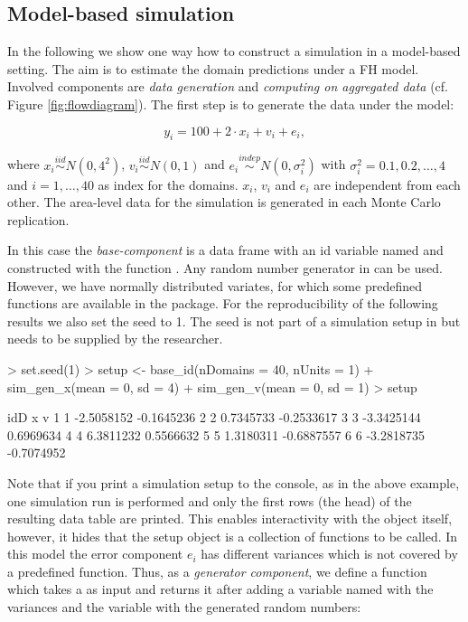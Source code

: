 \documentclass[article]{ajs}
\newcommand{\red}[1]{\color{red} #1 \color{black} }
\begin{document}
\subsection{Model-based simulation}
\label{sec:csModel}

In the following we show one way how to construct a simulation in a model-based setting. The aim is to estimate the domain predictions under a FH model. Involved components are \textit{data generation} and \textit{computing on aggregated data} (cf. Figure \ref{fig:flowdiagram}). The first step is to generate the data under the model:

\[ y_i = 100 + 2 \cdot x_i + v_i + e_i,\]

where $x_i \stackrel{iid}{\sim} N(0, 4^2)$, $v_i \stackrel{iid}{\sim} N(0, 1)$ and $e_i \stackrel{indep}{\sim} N(0, \sigma_i^2)$ with $\sigma_i^2 = 0.1, 0.2, \dots, 4$ and $i = 1, \dots, 40$ as index for the domains. $x_i$, $v_i$ and $e_i$ are independent from each other. The area-level data for the simulation is generated in each Monte Carlo replication. 

In this case the \textit{base-component} is a data frame with an id variable named  and constructed with the function . Any random number generator in  can be used. However, we have normally distributed variates, for which some predefined functions are available in the package. \red{For the reproducibility of the following results we also set the seed to 1. The seed is not part of a simulation setup in \proglang{saeSim} but needs to be supplied by the researcher.}

\begin{Schunk}
\begin{Sinput}
> set.seed(1)
> setup <- base_id(nDomains = 40, nUnits = 1) %
+   sim_gen_x(mean = 0, sd = 4) %
+   sim_gen_v(mean = 0, sd = 1)
> setup
\end{Sinput}
\begin{Soutput}
  idD          x          v
1   1 -2.5058152 -0.1645236
2   2  0.7345733 -0.2533617
3   3 -3.3425144  0.6969634
4   4  6.3811232  0.5566632
5   5  1.3180311 -0.6887557
6   6 -3.2818735 -0.7074952
\end{Soutput}
\end{Schunk}

Note that if you print a simulation setup to the console, as in the above example, one simulation run is performed and only the first rows (the head) of the resulting data table are printed. This enables interactivity with the object itself, however, it hides that the setup object is a collection of functions to be called. In this model the error component $e_i$ has different variances which is not covered by a predefined function. Thus, as a \textit{generator component}, we define a function which takes a  as input and returns it after adding a variable named  with the variances and the variable  with the generated random numbers:
\end{document}
